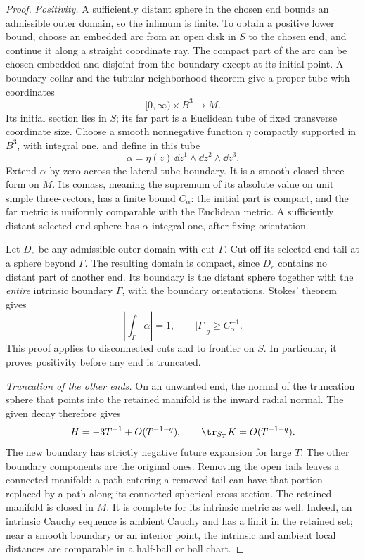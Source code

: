\begin{proof}
\emph{Positivity.} A sufficiently distant sphere in the chosen end bounds an admissible
outer domain, so the infimum is finite. To obtain a positive lower bound,
choose an embedded arc from an open disk in \(S\) to the chosen end, and
continue it along a straight coordinate ray. The compact part of the arc
can be chosen embedded and disjoint from the boundary except at its
initial point. A boundary collar and the tubular neighborhood theorem
give a proper tube with coordinates
\[
 [0,\infty)\times B^3\longrightarrow M.
\]
Its initial section lies in \(S\); its far part is a Euclidean tube of
fixed transverse coordinate size. Choose a smooth nonnegative function
\(\eta\) compactly supported in \(B^3\), with integral one, and define
in this tube
\[
 \alpha=\eta(z)\,\dd z^1\wedge\dd z^2\wedge\dd z^3.
\]
Extend \(\alpha\) by zero across the lateral tube boundary. It is a
smooth closed three-form on \(M\). Its comass, meaning the supremum of
its absolute value on unit simple three-vectors, has a finite bound
\(C_\alpha\): the initial part is compact, and the far metric is
uniformly comparable with the Euclidean metric. A sufficiently distant
selected-end sphere has \(\alpha\)-integral one, after fixing orientation.

Let \(D_e\) be any admissible outer domain with cut \(\Gamma\). Cut off
its selected-end tail at a sphere beyond \(\Gamma\). The resulting
domain is compact, since \(D_e\) contains no distant part of another
end. Its boundary is the distant sphere together with the \emph{entire}
intrinsic boundary \(\Gamma\), with the boundary orientations.
Stokes' theorem gives
\[
 \left|\int_\Gamma\alpha\right|=1,
 \qquad |\Gamma|_g\ge C_\alpha^{-1}.
\]
This proof applies to disconnected cuts and to frontier on \(S\).
In particular, it proves positivity before any end is truncated.

\smallskip
\noindent\emph{Truncation of the other ends.} On an unwanted end, the normal of the truncation sphere that points
into the retained manifold is the inward radial normal. The given decay
therefore gives
\[
 H=-3T^{-1}+O(T^{-1-q}),\qquad
 \tr_{S_T}K=O(T^{-1-q}).
\]
The new boundary has strictly negative future expansion for large
\(T\). The other boundary components are the original ones.
Removing the open tails leaves a connected manifold: a path entering a
removed tail can have that portion replaced by a path along its connected
spherical cross-section. The retained manifold is closed in \(M\).
It is complete for its intrinsic metric as well. Indeed, an intrinsic
Cauchy sequence is ambient Cauchy and has a limit in the retained set;
near a smooth boundary or an interior point, the intrinsic and ambient
local distances are comparable in a half-ball or ball chart.


\end{proof}
